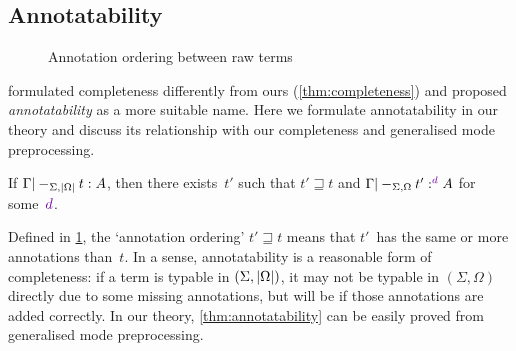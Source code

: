 \subsection{Annotatability}
\label{sec:annotatability}

\begin{figure}
  \centering\small
  
  \caption{Annotation ordering between raw terms}
  \label{fig:annotation-ordering}
\end{figure}

\citet{Dunfield2021} formulated completeness differently from ours (\cref{thm:completeness}) and proposed \emph{annotatability} as a more suitable name.
Here we formulate annotatability in our theory and discuss its relationship with our completeness and generalised mode preprocessing.

\begin{proposition}[Annotatability]\label{thm:annotatability}
If\/ $\Gamma |-_{\Sigma,\left|\Omega\right|} t : A$, then there exists~$t'$ such that\/ $t' \sqsupseteq t$ and $\Gamma |-_{\Sigma,\Omega} t' :^\dir{d} A$ for some~$\dir{d}$.
\end{proposition}

Defined in \cref{fig:annotation-ordering}, the `annotation ordering' $t' \sqsupseteq t$ means that $t'$~has the same or more annotations than~$t$.
In a sense, annotatability is a reasonable form of completeness: if a term is typable in $(\Sigma, \left|\Omega\right|)$, it may not be typable in $(\Sigma, \Omega)$ directly due to some missing annotations, but will be if those annotations are added correctly.
In our theory, \cref{thm:annotatability} can be easily proved from generalised mode preprocessing.

